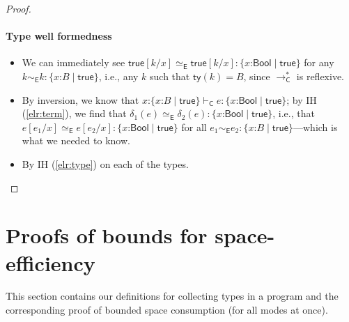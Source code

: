 \documentclass[9pt]{extarticle}
\newcommand{\ottnt}[1]{\mathit{#1}}
\newcommand{\ottsym}[1]{#1}
\begin{document}
\begin{lemma}
\begin{proof}
{    \paragraph{Type well formedness \fbox{$ \mathord{  \vdash _{  \mathsf{C}  } }~ \ottnt{T} $}}
    \begin{itemize}
    \item[\WF{Base}] We can immediately see $   \mathsf{true}   [  \ottnt{k} / \mathit{x}  ]    \simeq _{  \mathsf{E}  }    \mathsf{true}   [  \ottnt{k} / \mathit{x}  ]   :   \{ \mathit{x} \mathord{:}  \mathsf{Bool}  \mathrel{\mid}  \mathsf{true}  \}  $ for any $ \ottnt{k}   \sim _{  \mathsf{E}  }  \ottnt{k}  :   \{ \mathit{x} \mathord{:} \ottnt{B} \mathrel{\mid}  \mathsf{true}  \}  $, i.e., any
      $\ottnt{k}$ such that $ \mathsf{ty} ( \ottnt{k} )   \ottsym{=}  \ottnt{B}$, since $ \longrightarrow ^{*}_{  \mathsf{C}  } $ is
      reflexive.
    \item[\WF{Refine}] By inversion, we know that $  \mathit{x} \mathord{:}  \{ \mathit{x} \mathord{:} \ottnt{B} \mathrel{\mid}  \mathsf{true}  \}     \vdash _{  \mathsf{C}  }  \ottnt{e}  :   \{ \mathit{x} \mathord{:}  \mathsf{Bool}  \mathrel{\mid}  \mathsf{true}  \}  $; by IH (\ref{elr:term}), we find that
      $ \delta_{{\mathrm{1}}}  \ottsym{(}  \ottnt{e}  \ottsym{)}   \simeq _{  \mathsf{E}  }  \delta_{{\mathrm{2}}}  \ottsym{(}  \ottnt{e}  \ottsym{)}  :   \{ \mathit{x} \mathord{:}  \mathsf{Bool}  \mathrel{\mid}  \mathsf{true}  \}  $, i.e., that
      $  \ottnt{e}  [  \ottnt{e_{{\mathrm{1}}}} / \mathit{x}  ]    \simeq _{  \mathsf{E}  }   \ottnt{e}  [  \ottnt{e_{{\mathrm{2}}}} / \mathit{x}  ]   :   \{ \mathit{x} \mathord{:}  \mathsf{Bool}  \mathrel{\mid}  \mathsf{true}  \}  $ for all $ \ottnt{e_{{\mathrm{1}}}}   \sim _{  \mathsf{E}  }  \ottnt{e_{{\mathrm{2}}}}  :   \{ \mathit{x} \mathord{:} \ottnt{B} \mathrel{\mid}  \mathsf{true}  \}  $---which is what we needed to know.
    \item[\WF{Fun}] By IH (\ref{elr:type}) on each of the types.
    \end{itemize}
    \fi}
   \end{proof}
\end{lemma}

\section{Proofs of bounds for space-efficiency}
\label{app:bounds}

This section contains our definitions for collecting types in a
program and the corresponding proof of bounded space consumption (for
all modes at once).
\end{document}
